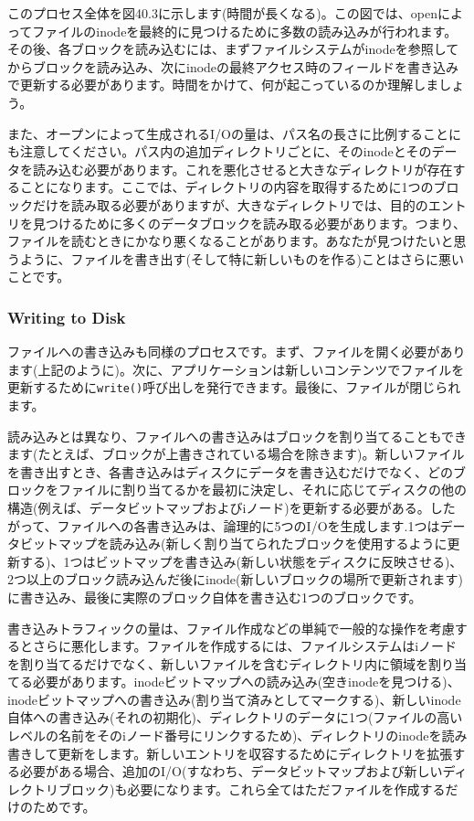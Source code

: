 このプロセス全体を図40.3に示します(時間が長くなる)。この図では、openによってファイルのinodeを最終的に見つけるために多数の読み込みが行われます。その後、各ブロックを読み込むには、まずファイルシステムがinodeを参照してからブロックを読み込み、次にinodeの最終アクセス時のフィールドを書き込みで更新する必要があります。時間をかけて、何が起こっているのか理解しましょう。

また、オープンによって生成されるI/Oの量は、パス名の長さに比例することにも注意してください。パス内の追加ディレクトリごとに、そのinodeとそのデータを読み込む必要があります。これを悪化させると大きなディレクトリが存在することになります。ここでは、ディレクトリの内容を取得するために1つのブロックだけを読み取る必要がありますが、大きなディレクトリでは、目的のエントリを見つけるために多くのデータブロックを読み取る必要があります。つまり、ファイルを読むときにかなり悪くなることがあります。あなたが見つけたいと思うように、ファイルを書き出す(そして特に新しいものを作る)ことはさらに悪いことです。

\hypertarget{writing-to-disk}{%
\subsubsection*{Writing to Disk}\label{writing-to-disk}}

ファイルへの書き込みも同様のプロセスです。まず、ファイルを開く必要があります(上記のように)。次に、アプリケーションは新しいコンテンツでファイルを更新するために\texttt{write()}呼び出しを発行できます。最後に、ファイルが閉じられます。

読み込みとは異なり、ファイルへの書き込みはブロックを割り当てることもできます(たとえば、ブロックが上書きされている場合を除きます)。新しいファイルを書き出すとき、各書き込みはディスクにデータを書き込むだけでなく、どのブロックをファイルに割り当てるかを最初に決定し、それに応じてディスクの他の構造(例えば、データビットマップおよびiノード)を更新する必要がある。したがって、ファイルへの各書き込みは、論理的に5つのI/Oを生成します.1つはデータビットマップを読み込み(新しく割り当てられたブロックを使用するように更新する)、1つはビットマップを書き込み(新しい状態をディスクに反映させる)、2つ以上のブロック読み込んだ後にinode(新しいブロックの場所で更新されます)に書き込み、最後に実際のブロック自体を書き込む1つのブロックです。

書き込みトラフィックの量は、ファイル作成などの単純で一般的な操作を考慮するとさらに悪化します。ファイルを作成するには、ファイルシステムはiノードを割り当てるだけでなく、新しいファイルを含むディレクトリ内に領域を割り当てる必要があります。inodeビットマップへの読み込み(空きinodeを見つける)、inodeビットマップへの書き込み(割り当て済みとしてマークする)、新しいinode自体への書き込み(それの初期化)、ディレクトリのデータに1つ(ファイルの高いレベルの名前をそのiノード番号にリンクするため)、ディレクトリのinodeを読み書きして更新をします。新しいエントリを収容するためにディレクトリを拡張する必要がある場合、追加のI/O(すなわち、データビットマップおよび新しいディレクトリブロック)も必要になります。これら全てはただファイルを作成するだけのためです。

